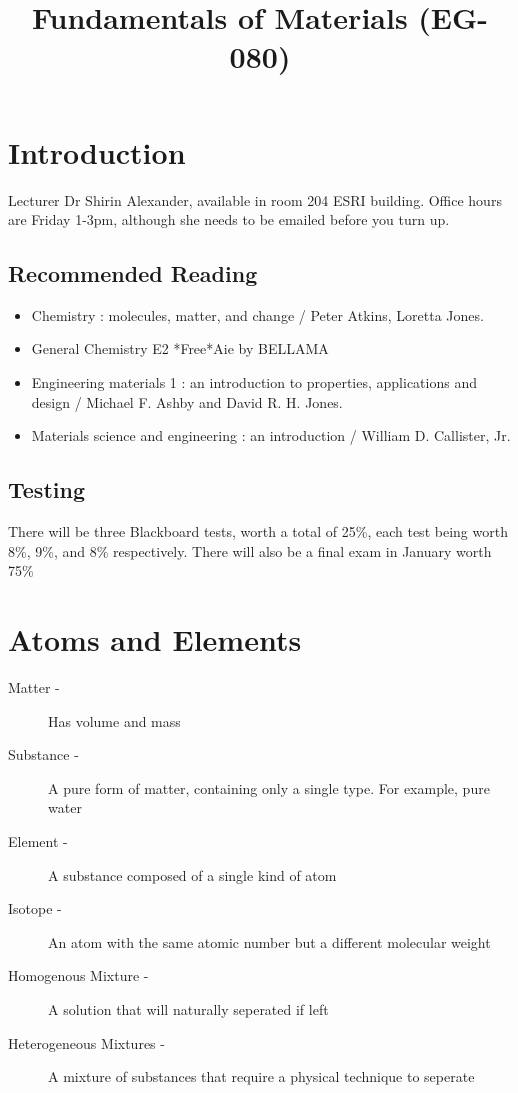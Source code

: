 \documentclass[a4paper, 12pt]{article}
\begin{document}
	\title{Fundamentals of Materials (EG-080)}
	\date{}
	\maketitle
	
	\tableofcontents
	
	\newpage
	
	\section*{Introduction}
		Lecturer Dr Shirin Alexander, available in room 204 ESRI building. Office hours are Friday 1-3pm, although she needs to be emailed before you turn up. 

	\subsection{Recommended Reading}
		\begin{itemize}
			\item Chemistry : molecules, matter, and change / Peter Atkins, Loretta Jones.
			\item General Chemistry E2 *Free*Aie by BELLAMA
			\item Engineering materials 1 : an introduction to properties, applications and design / Michael F. Ashby and David R. H. Jones.
			\item Materials science and engineering : an introduction / William D. Callister, Jr.
		\end{itemize}
	
	\subsection{Testing}
		There will be three Blackboard tests, worth a total of 25\%, each test being worth 8\%, 9\%, and 8\% respectively. There will also be a final exam in January worth 75\%
	
	\newpage		
	\section{Atoms and Elements}
		\begin{description}
			\item [Matter -] Has volume and mass 
			\item [Substance -] A pure form of matter, containing only a single type. For example, pure water 
			\item [Element -] A substance composed of a single kind of atom 
			\item [Isotope -] An atom with the same atomic number but a different molecular weight
			\item [Homogenous Mixture -] A solution that will naturally seperated if left 
			\item [Heterogeneous Mixtures -] A mixture of substances that require a physical technique to seperate
		\end{description}
		
\end{document}
